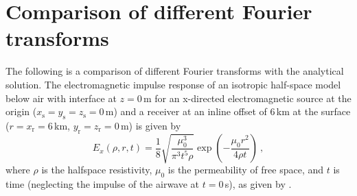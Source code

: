\documentclass[manuscript,revised]{geophysics}
\begin{document}
\section{Comparison of different Fourier transforms}

The following is a comparison of different Fourier transforms with the
analytical solution. The electromagnetic impulse response of an isotropic
half-space model below air with interface at $z=0\,$m for an x-directed
electromagnetic source at the origin
($x_\textrm{s}=y_\textrm{s}=z_\textrm{s}=0\,$m) and a receiver at an inline
offset of 6\,km at the surface ($r = x_\textrm{r}=6\,$km,
$y_\textrm{r}=z_\textrm{r}=0\,$m) is given by
%
\begin{equation}
  E_x(\rho,r,t) = \frac{1}{8} \sqrt{\frac{\mu_0^3}{\pi^3 t^5 \rho}}
                    \exp\left(-\frac{\mu_0 r^2}{4\rho t}\right)\ ,
  \label{eq:impulse}
\end{equation}
%
where $\rho$ is the halfspace resistivity, $\mu_0$ is the permeability of free
space, and $t$ is time (neglecting the impulse of the airwave at $t=0\,$s), as
given by \citet[][ eq. 5.38]{PhD.97.Wilson}.
\end{document}
